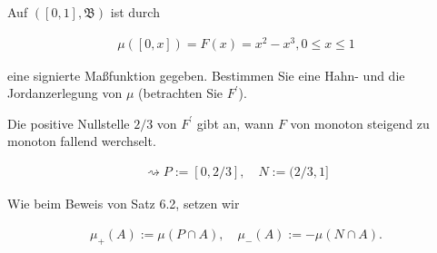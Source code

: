 
\begin{exercise}

Auf $([0, 1], \mathfrak B)$ ist durch

\begin{align*}
    \mu([0, x])
    =
    F(x)
    =
    x^2 - x^3,
    0 \leq x \leq 1
\end{align*}

eine signierte Maßfunktion gegeben.
Bestimmen Sie eine Hahn- und die Jordanzerlegung von $\mu$ (betrachten Sie $F^\prime$).

\end{exercise}


\begin{solution}

\phantom{}


Die positive Nullstelle $2/3$ von $F^\prime$ gibt an, wann $F$ von monoton steigend zu monoton fallend werchselt.

\begin{align*}
    \rightsquigarrow
    P := [0, 2/3],
    \quad
    N := (2/3, 1]
\end{align*}


Wie beim Beweis von Satz 6.2, setzen wir

\begin{align*}
    \mu_+(A) := \mu(P \cap A),
    \quad
    \mu_-(A) := -\mu(N \cap A).
\end{align*}

\end{solution}

